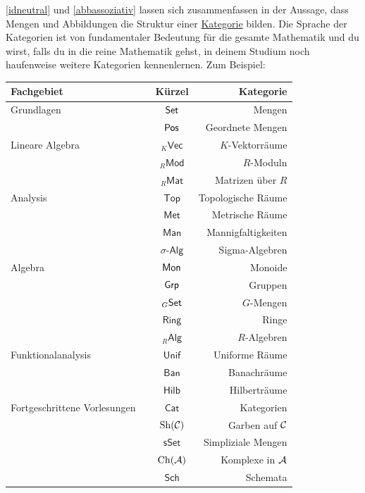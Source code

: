 \begin{vorschau} \label{kategorien}
    \cref{idneutral} und \cref{abbassoziativ} lassen sich zusammenfassen in der Aussage, dass Mengen und Abbildungen die Struktur einer \href{https://ncatlab.org/nlab/show/category}{Kategorie} bilden. Die Sprache der Kategorien ist von fundamentaler Bedeutung für die gesamte Mathematik und du wirst, falls du in die reine Mathematik gehst, in deinem Studium noch haufenweise weitere Kategorien kennenlernen. Zum Beispiel:
    \begin{longtable}{lccr}
    Fachgebiet & \phantom{Platzhalter} & Kürzel & \phantom{Platzhalterhalter} Kategorie \\
    \midrule
    Grundlagen && $\mathsf{Set}$ & Mengen \\ 
    && $\mathsf{Pos}$ & Geordnete Mengen \\[0.5em]
    Lineare Algebra && ${}_K\mathsf{Vec}$ & $K$-Vektorräume \\
    && ${}_R\mathsf{Mod}$ & $R$-Moduln \\
    && ${}_R\mathsf{Mat}$ & Matrizen über $R$ \\[0.5em]
    Analysis && $\mathsf{Top}$ & Topologische Räume \\
    && $\mathsf{Met}$ & Metrische Räume \\
    && $\mathsf{Man}$ & Mannigfaltigkeiten \\
    && $\sigma\mathsf{\text{-}Alg}$ & Sigma-Algebren \\[0.5em]
    Algebra && $\mathsf{Mon}$ & Monoide \\
    && $\mathsf{Grp}$ & Gruppen \\
    && ${}_G\mathsf{Set}$ & $G$-Mengen \\
    && $\mathsf{Ring}$ & Ringe \\
    && ${}_R\mathsf{Alg}$ & $R$-Algebren \\[0.5em]
    Funktionalanalysis && $\mathsf{Unif}$ & Uniforme Räume \\
    && $\mathsf{Ban}$ & Banachräume \\
    && $\mathsf{Hilb}$ & Hilberträume \\[0.5em]
    Fortgeschrittene Vorlesungen && $\mathsf{Cat}$ & Kategorien \\
    && $\mathrm{Sh}(\mathcal C)$ & Garben auf $\mathcal C$ \\
    && $\mathsf{sSet}$ & Simpliziale Mengen \\
    && $\mathrm{Ch}(\mathcal A)$ & Komplexe in $\mathcal A$ \\
    && $\mathsf{Sch}$ & Schemata \\
    \end{longtable}
\end{vorschau}


